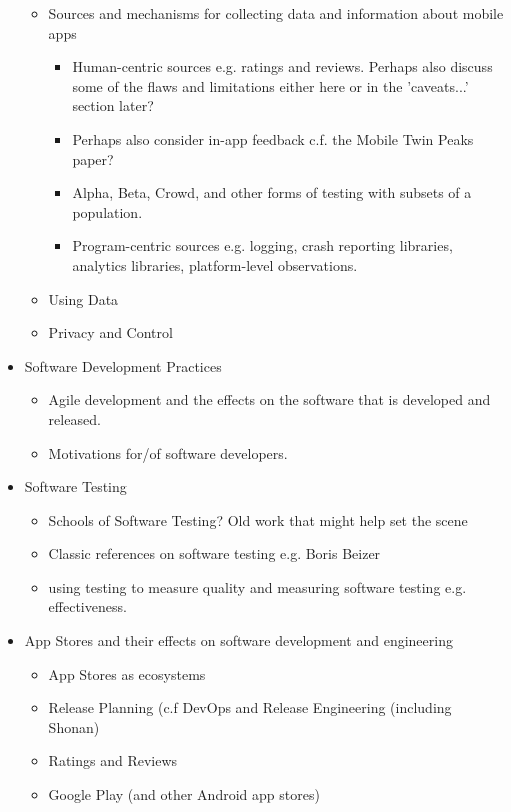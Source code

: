 \begin{itemize}
\begin{itemize}
        \item Sources and mechanisms for collecting data and information about mobile apps
        \begin{itemize}
            \item Human-centric sources e.g. ratings and reviews. Perhaps also discuss some of the flaws and limitations either here or in the 'caveats...' section later?
            \item Perhaps also consider in-app feedback c.f. the Mobile Twin Peaks paper?
            \item Alpha, Beta, Crowd, and other forms of testing with subsets of a population.
            \item Program-centric sources e.g. logging, crash reporting libraries, analytics libraries, platform-level observations.
        \end{itemize}
        \item Using Data
        \item Privacy and Control
    \end{itemize}
    \item Software Development Practices
    \begin{itemize}
        \item Agile development and the effects on the software that is developed and released.
        \item Motivations for/of software developers.
    \end{itemize}
    \item Software Testing
    \begin{itemize}
        \item Schools of Software Testing? Old work that might help set the scene
        \item Classic references on software testing e.g. Boris Beizer
        \item using testing to measure quality and measuring software testing e.g. effectiveness.
    \end{itemize}
    \item App Stores and their effects on software development and engineering
    \begin{itemize}
        \item App Stores as ecosystems
        \item Release Planning (c.f DevOps and Release Engineering (including Shonan)
        \item Ratings and Reviews
        \item Google Play (and other Android app stores)

\end{itemize}
\end{itemize}
